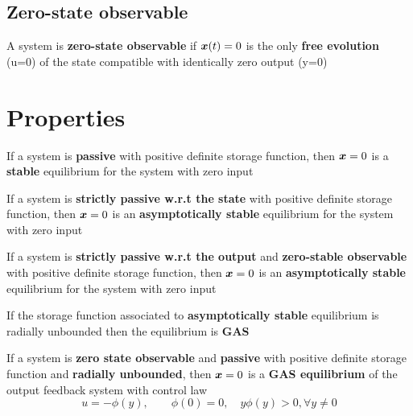 \subsection{Zero-state observable}

A system is \textbf{zero-state observable} if $\boldsymbol{x}(t) = 0$ is the only \textbf{free evolution} (u=0) of the state compatible with identically zero output (y=0)

\section{Properties}

\begin{theorem}
    If a system is \textbf{passive} with positive definite storage function, then $\boldsymbol{x}=0$ is a \textbf{stable} equilibrium for the system with zero input
\end{theorem}

\begin{theorem}
    If a system is \textbf{strictly passive w.r.t the state} with positive definite storage function, then $\boldsymbol{x}=0$ is an \textbf{asymptotically stable} equilibrium for the system with zero input
\end{theorem}

\begin{theorem}
    If a system is \textbf{strictly passive w.r.t the output} and \textbf{zero-stable observable} with positive definite storage function, then $\boldsymbol{x}=0$ is an \textbf{asymptotically stable} equilibrium for the system with zero input
\end{theorem}

\begin{theorem}
    If the storage function associated to \textbf{asymptotically stable} equilibrium is radially unbounded then the equilibrium is \textbf{GAS}
\end{theorem}

\begin{theorem}
    If a system is \textbf{zero state observable} and \textbf{passive} with positive definite storage function and \textbf{radially unbounded}, then $\boldsymbol{x}=0$ is a \textbf{GAS equilibrium} of the output feedback system with control law
    \[
        u=-\phi(y),\qquad \phi(0)=0, \quad y\phi(y)>0, \forall y \neq 0
    \]
\end{theorem}